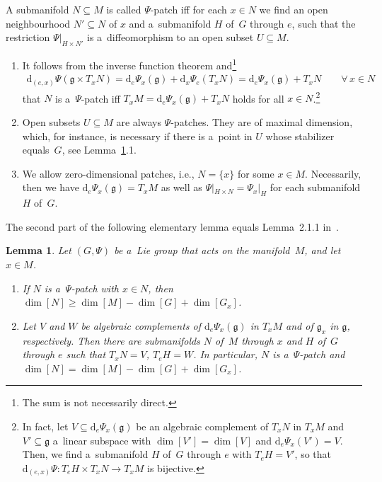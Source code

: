 \documentclass[11pt]{article}
\numberwithin{equation}{section}
\newtheorem{Lemma}[Theorem]{Lemma}
\begin{document}
\begin{Definition}
A submanifold $N\subseteq M$ is called $\Psi$-patch if\/f for each $x\in N$ we find an open neighbourhood $N'\subseteq N$
of $x$ and a~submanifold $H$ of~$G$ through $e$, such that the restriction $\Psi|_{H\times N'}$ is a~dif\/feomorphism to an
open subset $U\subseteq M$.
\end{Definition}

\begin{Remark}\label{rem:patch}\quad
\begin{enumerate}\itemsep=0pt
\item
It follows from the inverse function theorem and\footnote{The sum is not necessarily direct.}
\begin{gather*}
\mathrm{d}_{(e,x)}\Psi(\mathfrak{g}\times T_xN)= \mathrm{d}_e\Psi_x(\mathfrak{g}) + \mathrm{d}_x\Psi_e(T_xN)=
\mathrm{d}_e\Psi_x(\mathfrak{g})+T_xN
\qquad\forall\, x\in N
\end{gather*}
that $N$ is a~$\Psi$-patch if\/f $T_xM= \mathrm{d}_e\Psi_x(\mathfrak{g})+T_xN$ holds for all $x\in N$.\footnote{In fact, let $V\subseteq \mathrm{d}_e\Psi_x(\mathfrak{g})$ be an algebraic complement of $T_xN$ in $T_xM$ and $V'\subseteq
\mathfrak{g}$ a~linear subspace with $\dim[V']=\dim[V]$ and $\mathrm{d}_e\Psi_x(V')=V$.
Then, we f\/ind a~submanifold $H$ of~$G$ through $e$ with $T_eH=V'$, so that $\mathrm{d}_{(e,x)}\Psi\colon T_eH\times T_xN
\rightarrow T_xM$ is bijective.}
\item
Open subsets $U\subseteq M$ are always $\Psi$-patches.
They are of maximal dimension, which, for instance, is necessary if there is a~point in $U$ whose stabilizer equals~$G$,
see Lemma~\ref{lemma:mindimslice}.1.
\item
We allow zero-dimensional patches, i.e., $N=\{x\}$ for some $x\in M$.
Necessarily, then we have $\mathrm{d}_e\Psi_x(\mathfrak{g})=T_xM$ as well as $\Psi|_{H\times N}=\Psi_x|_{H}$ for each submanifold $H$
of~$G$.
\end{enumerate}
\end{Remark}

The second part of the following elementary lemma equals Lemma~2.1.1 in~\cite{DuisKolk}.
\begin{Lemma}\label{lemma:mindimslice}
Let $(G,\Psi)$ be a~Lie group that acts on the manifold~$M$, and let $x\in M$.
\begin{enumerate}\itemsep=0pt%
\item[$1.$]
If $N$ is a~$\Psi$-patch with $x\in N$, then $\dim[N]\geq \dim[M]-\dim[G]+\dim[G_x]$.
\item[$2.$]
Let $V$ and $W$ be algebraic complements of $\mathrm{d}_e\Psi_x(\mathfrak{g})$ in $T_xM$ and of $\mathfrak{g}_x$ in
$\mathfrak{g}$, respectively.
Then there are submanifolds $N$ of~$M$ through $x$ and $H$ of~$G$ through $e$ such that $T_xN=V$, $T_eH=W$.
In particular, $N$ is a~$\Psi$-patch and $\dim[N]=\dim[M]-\dim[G]+\dim[G_x]$.
\end{enumerate}
\end{Lemma}
\end{document}
